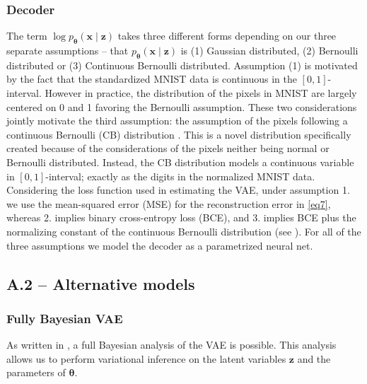 \subsubsection*{Decoder}
The term  $\log p_{\bm{\theta}}(\mathbf{x} \mid  \mathbf{z})$ takes three different forms depending on our three separate assumptions – that $p_{\bm{\theta}}(\mathbf{x} \mid  \mathbf{z})$ is (1) Gaussian  distributed, (2) Bernoulli distributed or (3) Continuous Bernoulli  distributed. Assumption (1) is motivated by the fact that the standardized MNIST data is continuous in the $[0,1]$-interval. However in practice, the distribution of the pixels in MNIST are largely centered on 0 and 1 favoring the Bernoulli assumption. These two considerations jointly motivate the third assumption: the assumption of the pixels following a continuous Bernoulli (CB) distribution \cite{CB}. This is a novel distribution specifically created because of the considerations of the pixels neither being normal or Bernoulli distributed. Instead, the CB distribution models a continuous variable in $[0, 1]$-interval; exactly as the digits in the normalized MNIST data.  
Considering the loss function used in estimating the VAE, under assumption 1. we use the mean-squared error (MSE) for the reconstruction error in \eqref{eq7}, whereas 2. implies binary cross-entropy loss (BCE), and 3. implies BCE plus the normalizing constant of the continuous Bernoulli distribution (see \cite{CB}). 
For all of the three assumptions we model the decoder as a parametrized neural net.



\subsection*{A.2 – Alternative models}
\subsubsection*{Fully Bayesian VAE}
As written in \citep{BVAE}, a full Bayesian analysis of the VAE is possible. This analysis allows us to perform variational inference on
the latent variables $\mathbf{z}$ and the parameters of $\bm{\theta}$.

